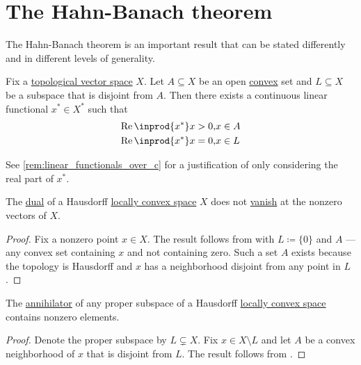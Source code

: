 \section{The Hahn-Banach theorem}\label{sec:hahn_banach}

The Hahn-Banach theorem is an important result that can be stated differently and in different levels of generality.

\begin{theorem}\label{thm:geometric_hahn_banach}
  Fix a \hyperref[def:topological_vector_space]{topological vector space} \( X \). Let \( A \subseteq X \) be an open \hyperref[def:convex_hull]{convex} set and \( L \subseteq X \) be a subspace that is disjoint from \( A \). Then there exists a continuous linear functional \( x^* \in X^* \) such that
  \begin{equation*}
    \begin{aligned}
      \real \inprod{x^*} x > 0, &x \in A \\
      \real \inprod{x^*} x = 0, &x \in L
    \end{aligned}
  \end{equation*}

  See \cref{rem:linear_functionals_over_c} for a justification of only considering the real part of \( x^* \).
\end{theorem}

\begin{corollary}\label{thm:hahn_banach_implies_functionals_vanish_nowhere}
  The \hyperref[def:dual_vector_space]{dual} of a Hausdorff \hyperref[def:locally_convex_space]{locally convex space} \( X \) does not \hyperref[def:functions_vanish_nowhere]{vanish} at the nonzero vectors of \( X \).
\end{corollary}
\begin{proof}
  Fix a nonzero point \( x \in X \). The result follows from  with \( L \coloneqq \{ 0 \} \) and \( A \) --- any convex set containing \( x \) and not containing zero. Such a set \( A \) exists because the topology is Hausdorff and \( x \) has a neighborhood disjoint from any point in \( L \).
\end{proof}

\begin{corollary}\label{thm:hahn_banach_implies_annihilator_nontrivial}
  The \hyperref[def:vector_space_annihilator]{annihilator} of any proper subspace of a Hausdorff \hyperref[def:locally_convex_space]{locally convex space} contains nonzero elements.
\end{corollary}
\begin{proof}
  Denote the proper subspace by \( L \subsetneq X \). Fix \( x \in X \setminus L \) and let \( A \) be a convex neighborhood of \( x \) that is disjoint from \( L \). The result follows from .
\end{proof}

